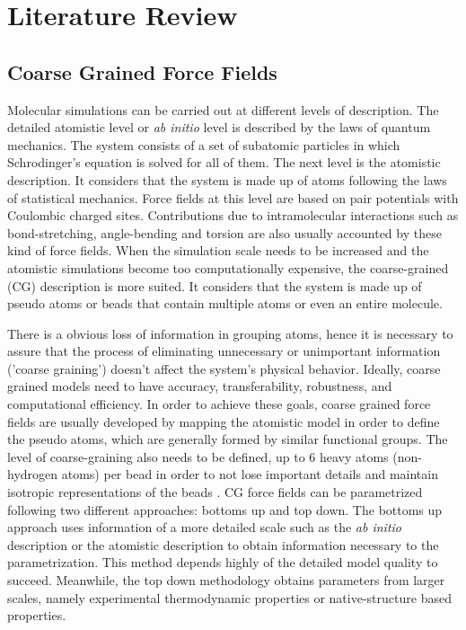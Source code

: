 
\chapter{Literature Review} %

\label{Chapter2} %



\section{Coarse Grained Force Fields}

Molecular simulations can be carried out at different levels of description. The detailed atomistic level or \textit{ab initio} level is described by the laws of quantum mechanics. The system consists of a set of subatomic particles in which Schrodinger's equation is solved for all of them. The next level is the atomistic description. It considers that the system is made up of atoms following the laws of statistical mechanics.  Force fields at this level are based on pair potentials with Coulombic charged sites. Contributions due to intramolecular interactions such as bond-stretching, angle-bending and torsion are also usually accounted by these kind of force fields. When the simulation scale needs to be increased and the atomistic simulations become too computationally expensive, the coarse-grained (CG) description is more suited. It considers that the system is made up of pseudo atoms or beads that contain multiple atoms or even an entire molecule. 

There is a obvious loss of information in grouping atoms, hence it is necessary to assure that the process of eliminating unnecessary or unimportant information ('coarse graining') doesn't affect the system's physical behavior. Ideally, coarse grained models need to have accuracy, transferability, robustness, and computational efficiency. In order to achieve these goals, coarse grained force fields are usually developed by mapping the atomistic model in order to define the pseudo atoms, which are generally formed by similar functional groups. The level of coarse-graining also needs to be defined, up to 6 heavy atoms (non-hydrogen atoms) per bead in order to not lose important details and maintain isotropic representations of the beads \cite{shinoda2007,martini2007,hadley2012}. CG force fields can be parametrized following two different approaches: bottoms up and top down. The bottoms up approach uses information of a more detailed scale such as the \textit{ab initio} description or the atomistic description to obtain information necessary to the parametrization. This method depends highly of the detailed model quality to succeed. Meanwhile, the top down methodology obtains parameters from larger scales, namely experimental thermodynamic properties or native-structure based properties. 

